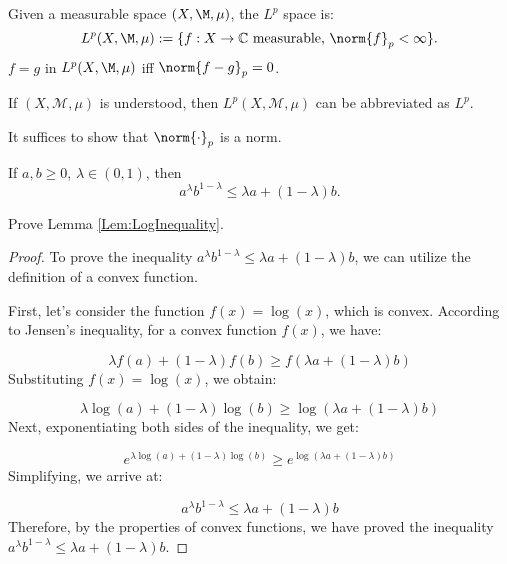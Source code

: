 \begin{defn}[$L^{p}$-space]
    \label{Defn:LpSpace}
    Given a measurable space $(X,\M,\mu)$, the $L^{p}$ space 
    is:
    \begin{displaymath}
        L^{p}(X,\M,\mu):=\{f:X\rightarrow\mathbb{C}
        \text{ measurable, }\norm{f}_{p}<\infty\}.
    \end{displaymath}
    $f=g$ in $L^{p}(X,\M,\mu)$ iff 
    $\norm{f-g}_{p}=0$.
\end{defn}
\begin{ntn}
    If $(X,\mathcal{M},\mu)$ is understood, 
    then $L^{p}(X,\mathcal{M},\mu)$ can be abbreviated as $L^{p}$. 
\end{ntn}
\begin{rem}
    It suffices to show that $\norm{\cdot}_{p}$ 
    is a norm.
\end{rem}
\begin{lem}
    \label{Lem:LogInequality}
    If $a,b\ge 0$, $\lambda\in(0,1)$, then 
    \begin{displaymath}
        a^{\lambda}b^{1-\lambda}\le\lambda a+(1-\lambda)b.
    \end{displaymath}
\end{lem}
\begin{exc}
    Prove Lemma \ref{Lem:LogInequality}.
\end{exc}
\begin{proof}
    To prove the inequality $a^{\lambda}b^{1-\lambda} 
    \leq \lambda a + (1-\lambda)b$, we can utilize the 
    definition of a convex function.

    First, let's consider the function $f(x) = \log(x)$, 
    which is convex. According to Jensen's inequality, 
    for a convex function $f(x)$, we have:

    $$
    \lambda f(a) + (1-\lambda)f(b) \geq 
    f(\lambda a + (1-\lambda)b)
    $$
    Substituting $f(x) = \log(x)$, we obtain:

    $$
    \lambda \log(a) + (1-\lambda)\log(b) \geq 
    \log(\lambda a + (1-\lambda)b)
    $$
    Next, exponentiating both sides of the inequality, we get:

    $$
    e^{\lambda \log(a) + (1-\lambda)\log(b)} \geq 
    e^{\log(\lambda a + (1-\lambda)b)}
    $$
    Simplifying, we arrive at:

    $$
    a^{\lambda}b^{1-\lambda} \leq \lambda a + (1-\lambda)b
    $$
    Therefore, by the properties of convex functions, 
    we have proved the inequality $a^{\lambda}b^{1-\lambda} 
    \leq \lambda a + (1-\lambda)b$.
\end{proof}
